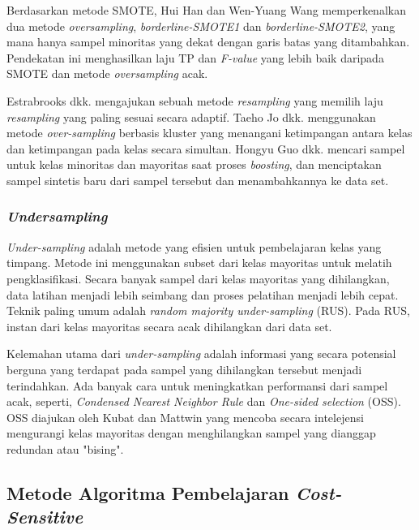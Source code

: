 \documentclass[12pt,a4paper,titlepage]{article}
\begin{document}
Berdasarkan metode SMOTE, Hui Han dan Wen-Yuang Wang \cite{han2005borderline} memperkenalkan dua metode \textit{oversampling}, \textit{borderline-SMOTE1} dan \textit{borderline-SMOTE2}, yang mana hanya sampel minoritas yang dekat dengan garis batas yang ditambahkan.
Pendekatan ini menghasilkan laju TP dan \textit{F-value} yang lebih baik daripada SMOTE dan metode \textit{oversampling} acak.

Estrabrooks dkk. \cite{estabrooks2004multiple} mengajukan sebuah metode \textit{resampling} yang memilih laju \textit{resampling} yang paling sesuai secara adaptif.
Taeho Jo dkk. \cite{jo2004class} menggunakan metode \textit{over-sampling} berbasis kluster yang menangani ketimpangan antara kelas dan ketimpangan pada kelas secara simultan.
Hongyu Guo dkk. \cite{guo2004learning} mencari sampel untuk kelas minoritas dan mayoritas saat proses \textit{boosting}, dan menciptakan sampel sintetis baru dari sampel tersebut dan menambahkannya ke data set.


\subsubsection{\textit{Undersampling}}\label{subsubsec:undersampling}

\textit{Under-sampling} adalah metode yang efisien untuk pembelajaran kelas yang timpang.
Metode ini menggunakan subset dari kelas mayoritas untuk melatih pengklasifikasi.
Secara banyak sampel dari kelas mayoritas yang dihilangkan, data latihan menjadi lebih seimbang dan proses pelatihan menjadi lebih cepat.
Teknik paling umum adalah \textit{random majority under-sampling} (RUS).
Pada RUS, instan dari kelas mayoritas secara acak dihilangkan dari data set.

Kelemahan utama dari \textit{under-sampling} adalah informasi yang secara potensial berguna yang terdapat pada sampel yang dihilangkan tersebut menjadi terindahkan.
Ada banyak cara untuk meningkatkan performansi dari sampel acak, seperti, \textit{Condensed Nearest Neighbor Rule} dan \textit{One-sided selection} (OSS).
OSS diajukan oleh Kubat dan Mattwin \cite{kubat1997addressing} yang mencoba secara intelejensi mengurangi kelas mayoritas dengan menghilangkan sampel yang dianggap redundan atau "bising".

\subsection{Metode Algoritma Pembelajaran \textit{Cost-Sensitive}}
\end{document}
